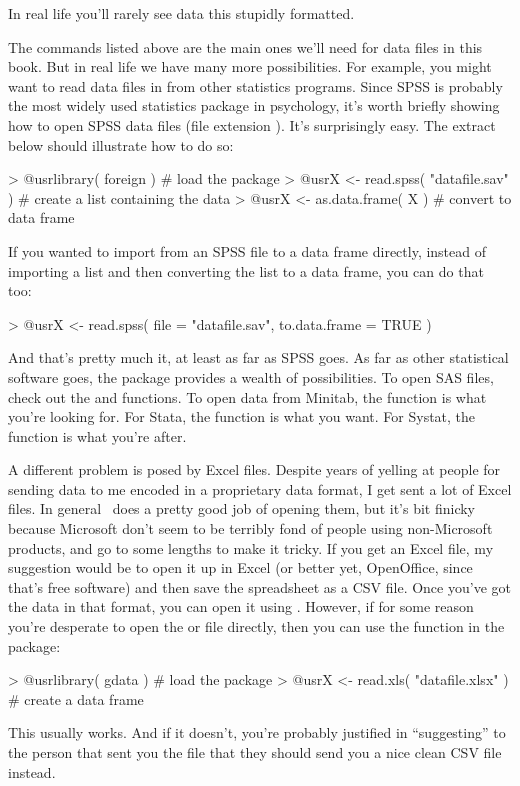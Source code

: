 In real life you'll rarely see data this stupidly formatted. 


The commands listed above are the main ones we'll need for data files in this book. But in real life we have many more possibilities. For example, you might want to read data files in from other statistics programs. Since SPSS is probably the most widely used statistics package in psychology, it's worth briefly showing how to open SPSS data files (file extension ). It's surprisingly easy. The extract below should illustrate how to do so:
\begin{rblock1}
> @usr{library( foreign )}                 # load the package
> @usr{X <- read.spss( "datafile.sav" )}   # create a list containing the data
> @usr{X <- as.data.frame( X )}            # convert to data frame
\end{rblock1}
If you wanted to import from an SPSS file to a data frame directly, instead of importing a list and then converting the list to a data frame, you can do that too:
\begin{rblock1}
> @usr{X <- read.spss( file = "datafile.sav", to.data.frame = TRUE )}
\end{rblock1}
And that's pretty much it, at least as far as SPSS goes.  As far as other statistical software goes, the  package provides a wealth of possibilities. To open SAS files, check out the and  functions. To open data from Minitab, the  function is what you're looking for. For Stata, the  function is what you want. For Systat, the  function is what you're after. 


A different problem is posed by Excel files. Despite years of yelling at people for sending data to me encoded in a proprietary data format, I get sent a lot of Excel files. In general \R\ does a pretty good job of opening them, but it's bit finicky because Microsoft don't seem to be terribly fond of people using non-Microsoft products, and go to some lengths to make it tricky. If you get an Excel file, my suggestion would be to open it up in Excel (or better yet, OpenOffice, since that's free software) and then save the spreadsheet as a CSV file. Once you've got the data in that format, you can open it using . However, if for some reason you're desperate to open the  or  file directly, then you can use the  function in the  package:
\begin{rblock1}
> @usr{library( gdata )}                   # load the package
> @usr{X <- read.xls( "datafile.xlsx" )}   # create a data frame
\end{rblock1} 
This usually works. And if it doesn't, you're probably justified in ``suggesting'' to the person that sent you the file that they should send you a nice clean CSV file instead.

